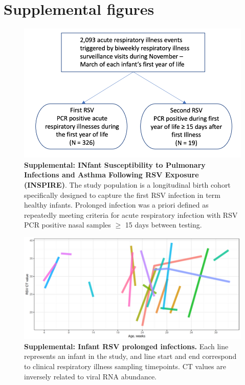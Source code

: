\documentclass{article} %
\begin{document}
\section{Supplemental figures}

\begin{figure}[ht] \hspace*{0cm}  \begin{center}
        \includegraphics[scale=0.4]{flowchart}
	\caption{\textbf{Supplemental: INfant Susceptibility to Pulmonary Infections and Asthma Following RSV Exposure (INSPIRE)}.
	 The study population is a longitudinal birth cohort specifically designed to capture the first RSV infection in term healthy infants. Prolonged infection was a priori defined as repeatedly meeting criteria for acute respiratory infection with RSV PCR positive nasal samples $\ge$ 15 days between testing.}
	\label{fig:1}
 \end{center} \end{figure}


\begin{figure}[ht] \hspace*{0cm}  \begin{center}
    \includegraphics[scale=0.5]{CTvalues}
	\caption{\textbf{Supplemental: Infant RSV prolonged infections.} Each line represents an infant in the study, and line start and end correspond to clinical respiratory illness sampling timepoints. CT values are inversely related to viral RNA abundance.}
	\label{fig:CTvalues}
 \end{center} \end{figure}
 
\end{document}
